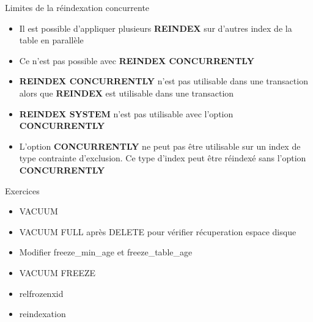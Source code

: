 \begin{frame}[fragile]{Limites de la réindexation concurrente}

\begin{itemize}
   \item Il est possible d'appliquer plusieurs \textbf{REINDEX} sur d'autres index de la table en parallèle
   \item Ce n'est pas possible avec \textbf{REINDEX CONCURRENTLY}
   \item \textbf{REINDEX CONCURRENTLY} n'est pas utilisable dans une transaction alors que \textbf{REINDEX} est utilisable dans une transaction
   \item \textbf{REINDEX SYSTEM} n'est pas utilisable avec l'option \textbf{CONCURRENTLY}
   \item L'option \textbf{CONCURRENTLY} ne peut pas être utilisable sur un index de type contrainte d'exclusion. Ce type d'index peut être réindexé sans l'option \textbf{CONCURRENTLY}

\end{itemize}


\begin{tiny}
\begin{toile}
\end{toile}
\end{tiny}

\end{frame}


\begin{frame}[fragile]{Exercices}

   \begin{itemize}
\item VACUUM
\item VACUUM FULL après DELETE pour vérifier récuperation espace disque
\item Modifier freeze\_min\_age et freeze\_table\_age
\item VACUUM FREEZE
\item relfrozenxid
\item reindexation
   \end{itemize}

\end{frame}


